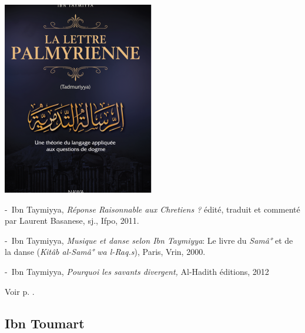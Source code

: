 \begin{marginfigure}
\includegraphics[width=\textwidth]{Images/image026.png}
\end{marginfigure}

-~Ibn Taymiyya, \emph{Réponse Raisonnable aux Chretiens ?} édité,
traduit et commenté par Laurent Basanese, sj., Ifpo, 2011.

-~Ibn Taymiyya, \emph{Musique et danse selon Ibn Taymiyya}: Le livre du
\emph{Samâ°} et de la danse (\emph{Kitâb al-Samâ° wa l-Raq.s}), Paris,
Vrin, 2000.

-~Ibn Taymiyya, \emph{Pourquoi les savants divergent,} Al-Hadith
éditions, 2012


Voir p. \pageref{ibn-taymiyya}.


\subsection{Ibn Toumart}
\label{IbnToumart}


